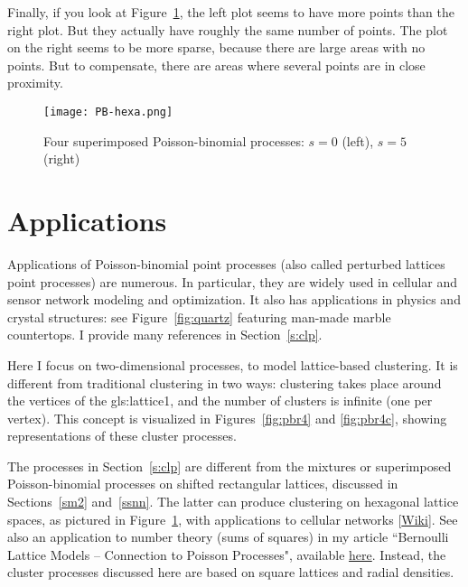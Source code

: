 \documentclass[10pt]{article}
\begin{document}
Finally, if you look at Figure~\ref{fig:hexa}, the left plot seems to have more points than the right plot. But they actually have roughly the same number of points. The plot on the right seems to be more sparse, because there are large areas with no points. But to compensate, there are areas where several points are in close proximity.


\begin{figure}%
\centering
\texttt{[image: PB-hexa.png]}
\caption{Four superimposed Poisson-binomial processes: $s=0$ (left), $s=5$ (right)}
\label{fig:hexa}
\end{figure}


\section{Applications}

Applications of Poisson-binomial point processes (also called \textcolor{index}{perturbed lattices point processes}) are numerous. In particular, they are widely used in cellular and sensor network modeling and optimization. It also has applications in physics and crystal structures: see Figure~\ref{fig:quartz} featuring 
 man-made marble
 countertops. I provide many references in Section~\ref{s:clp}.

Here I focus on two-dimensional processes, to model lattice-based clustering. It is different from traditional clustering in two ways: clustering 
takes place around the vertices of the \gls{gls:lattice1}, and the number of clusters is infinite (one per \textcolor{index}{vertex}). 
This concept is visualized in Figures~\ref{fig:pbr4} and \ref{fig:pbr4c}, showing representations of these 
\textcolor{index}{cluster processes}. 

The processes in Section~\ref{s:clp}  are different from the mixtures or superimposed  Poisson-binomial processes on \textcolor{index}{shifted rectangular lattices}, discussed in Sections~\ref{sm2} and~\ref{ssnn}. The latter can produce clustering on 
\textcolor{index}{hexagonal} lattice spaces, as
 pictured in Figure~\ref{fig:hexa}, with
applications to cellular networks [\href{https://en.wikipedia.org/wiki/Cellular_network}{Wiki}]. See also
an application to number theory (sums of squares)
 in my article ``Bernoulli Lattice Models -- Connection to Poisson Processes", available \href{https://www.vgranville.com/2022/02/bernoulli-lattice-models-connection-to.html}{here}. Instead, the cluster processes discussed here are based on square lattices and radial densities.
\end{document}
